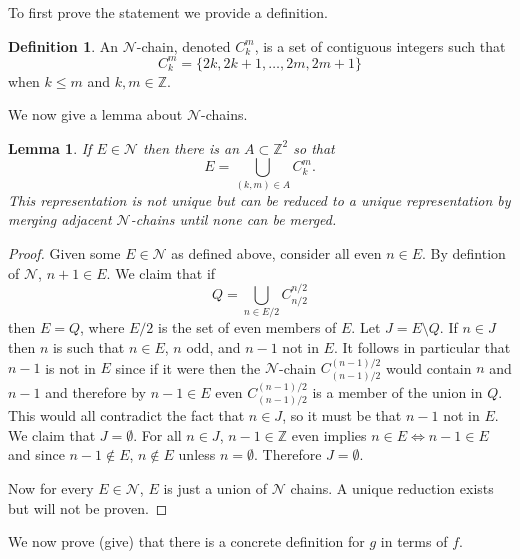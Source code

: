 \documentclass[11pt]{amsart}
\newtheorem{lemma}[theorem]{Lemma}
\theoremstyle{definition}
\newtheorem{definition}{Definition}
\numberwithin{theorem}{section}
\numberwithin{definition}{section}
\numberwithin{equation}{section}
\def\scriptn{{\mathcal N}}
\begin{document}
To first prove the statement we provide a definition.
\begin{definition}
	An $\scriptn$-chain, denoted $C_k^m$, is a set of contiguous integers
	such that
	\begin{equation*}
		C_k^m = \{2k, 2k+1, \dots, 2m, 2m+1\}
	\end{equation*}
	when $k\leq m$ and $k,m \in \mathbb{Z}.$
\end{definition}
We now give a lemma about $\scriptn$-chains.
\begin{lemma}
	If $E \in \scriptn$ then there is an $A \subset \mathbb{Z}^2$
	so that
	\begin{equation*}
		E = \bigcup_{(k,m) \in A} C_k^m.
	\end{equation*}
	This representation is not unique but can be reduced to a unique representation by
	merging adjacent $\scriptn$-chains until none can be merged.
\end{lemma}
\begin{proof}
	Given some $E \in \scriptn$ as defined above, consider all even $n \in E$. By defintion
	of $\scriptn$, $n+1 \in E.$ We claim that  if
	\begin{equation*}
		Q = \bigcup_{n \in E/2} C_{n/2}^{n/2}
	\end{equation*}
	then $E = Q$,
	where $E/2$ is the set of even members of $E$. Let $J = E \setminus Q$.
	If $n \in J$ then $n$ is such that $n \in E$, $n$ odd, and $n-1$ not in $E$. It follows in particular that $n-1$
	is not in $E$ since if it were then the $\scriptn$-chain $C_{(n-1)/2}^{(n-1)/2}$  would contain $n$ and $n-1$
	and therefore by $n-1 \in E$ even $C_{(n-1)/2}^{(n-1)/2}$ is a member of the union in $Q$. This would all contradict the fact that $n \in J$, so it must be that $n-1$ not in $E$. We claim that $J = \emptyset$. For all $ n \in J$, $n-1 \in \mathbb{Z}$ even implies $n \in E \iff n-1 \in E$ and since
	$n-1 \notin E$, $n \notin E$ unless $n = \emptyset.$ Therefore $J = \emptyset.$

	Now for every $E \in \scriptn$, $E$ is just a union of $\scriptn$ chains. A unique reduction exists but will not be proven.
\end{proof}
We now prove  (give) that there is a  concrete definition for $g$ in terms of $f.$
\end{document}
